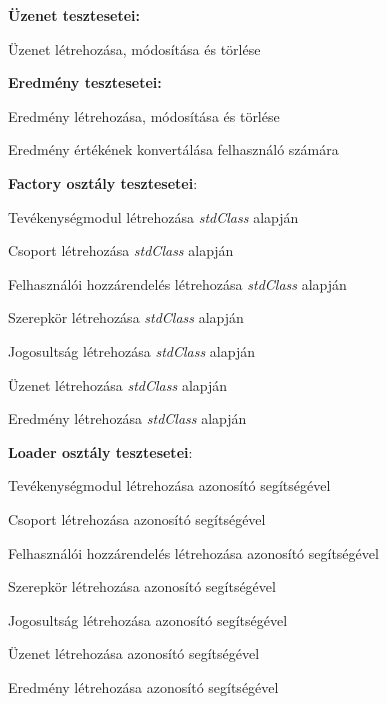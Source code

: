 \begin{compactitem}
\begin{compactitem}
\end{compactitem}
\item \textbf{Üzenet tesztesetei:}
\begin{compactitem}
        \item Üzenet létrehozása, módosítása és törlése
\end{compactitem}
\item \textbf{Eredmény tesztesetei:}
\begin{compactitem}
        \item Eredmény létrehozása, módosítása és törlése
        \item Eredmény értékének konvertálása felhasználó számára
\end{compactitem}
\item \textbf{Factory osztály tesztesetei}:
\begin{compactitem}
        \item Tevékenységmodul létrehozása \textit{stdClass} alapján
        \item Csoport létrehozása \textit{stdClass} alapján
        \item Felhasználói hozzárendelés létrehozása \textit{stdClass} alapján
        \item Szerepkör létrehozása \textit{stdClass} alapján
        \item Jogosultság létrehozása \textit{stdClass} alapján
        \item Üzenet létrehozása \textit{stdClass} alapján
        \item Eredmény létrehozása \textit{stdClass} alapján
\end{compactitem}
\item \textbf{Loader osztály tesztesetei}:
\begin{compactitem}
        \item Tevékenységmodul létrehozása azonosító segítségével
        \item Csoport létrehozása azonosító segítségével
        \item Felhasználói hozzárendelés létrehozása azonosító segítségével
        \item Szerepkör létrehozása azonosító segítségével
        \item Jogosultság létrehozása azonosító segítségével
        \item Üzenet létrehozása azonosító segítségével
        \item Eredmény létrehozása azonosító segítségével
\end{compactitem}
\end{compactitem}

